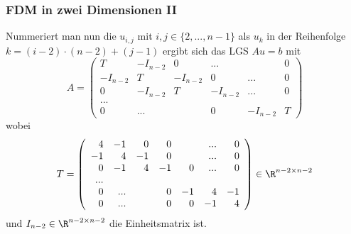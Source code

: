\begin{frame}\frametitle{FDM in zwei Dimensionen II}
Nummeriert man nun die $u_{i,j}$ mit $ i,j \in \{2,...,n-1\}$ als $u_k$ in der Reihenfolge $k=(i-2)\cdot (n-2) +(j-1)$ ergibt sich das LGS $Au=b$ mit
\small
$$
A=\left(\begin{array}{c|c|c|c|c|c} 
T & -I_{n-2} & 0&...&&0 \\\hline
-I_{n-2} & T & -I_{n-2} & 0&... &0\\\hline
0 & -I_{n-2}& T & -I_{n-2}& ... &0\\\hline
...\\\hline
0 & ...&&0&-I_{n-2}&T
\end{array}\right)
$$
wobei
$$
T= \left(\begin{array}{rrrrrrr}
	4&-1&0&0&&...&0 \\-1&4&-1&0&&...&0\\0&-1&4&-1&0&...&0\\...\\0&...&&0&-1&4&-1 \\0&...&&0&0&-1&4
	\end{array}\right) \in \R^{n-2 \times n-2}
$$
\normalsize
und $I_{n-2}\in \R^{n-2 \times n-2}$ die Einheitsmatrix ist.
\end{frame}
